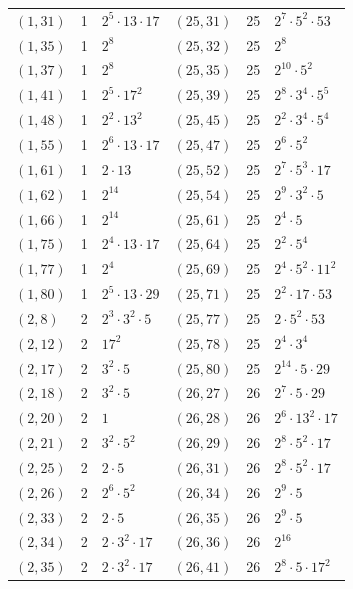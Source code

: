 \documentclass[11pt]{article}
\begin{document}
\begin{longtable}{@{}lrl@{\qquad}lrl@{}}
$(1,31)$ & 1 & $2^{5}\cdot 13\cdot 17$ & $(25,31)$ & 25 & $2^{7}\cdot 5^{2}\cdot 53$\\
$(1,35)$ & 1 & $2^{8}$ & $(25,32)$ & 25 & $2^{8}$\\
$(1,37)$ & 1 & $2^{8}$ & $(25,35)$ & 25 & $2^{10}\cdot 5^{2}$\\
$(1,41)$ & 1 & $2^{5}\cdot 17^{2}$ & $(25,39)$ & 25 & $2^{8}\cdot 3^{4}\cdot 5^{5}$\\
$(1,48)$ & 1 & $2^{2}\cdot 13^{2}$ & $(25,45)$ & 25 & $2^{2}\cdot 3^{4}\cdot 5^{4}$\\
$(1,55)$ & 1 & $2^{6}\cdot 13\cdot 17$ & $(25,47)$ & 25 & $2^{6}\cdot 5^{2}$\\
$(1,61)$ & 1 & $2\cdot 13$ & $(25,52)$ & 25 & $2^{7}\cdot 5^{3}\cdot 17$\\
$(1,62)$ & 1 & $2^{14}$ & $(25,54)$ & 25 & $2^{9}\cdot 3^{2}\cdot 5$\\
$(1,66)$ & 1 & $2^{14}$ & $(25,61)$ & 25 & $2^{4}\cdot 5$\\
$(1,75)$ & 1 & $2^{4}\cdot 13\cdot 17$ & $(25,64)$ & 25 & $2^{2}\cdot 5^{4}$\\
$(1,77)$ & 1 & $2^{4}$ & $(25,69)$ & 25 & $2^{4}\cdot 5^{2}\cdot 11^{2}$\\
$(1,80)$ & 1 & $2^{5}\cdot 13\cdot 29$ & $(25,71)$ & 25 & $2^{2}\cdot 17\cdot 53$\\
$(2,8)$ & 2 & $2^{3}\cdot 3^{2}\cdot 5$ & $(25,77)$ & 25 & $2\cdot 5^{2}\cdot 53$\\
$(2,12)$ & 2 & $17^{2}$ & $(25,78)$ & 25 & $2^{4}\cdot 3^{4}$\\
$(2,17)$ & 2 & $3^{2}\cdot 5$ & $(25,80)$ & 25 & $2^{14}\cdot 5\cdot 29$\\
$(2,18)$ & 2 & $3^{2}\cdot 5$ & $(26,27)$ & 26 & $2^{7}\cdot 5\cdot 29$\\
$(2,20)$ & 2 & $1$ & $(26,28)$ & 26 & $2^{6}\cdot 13^{2}\cdot 17$\\
$(2,21)$ & 2 & $3^{2}\cdot 5^{2}$ & $(26,29)$ & 26 & $2^{8}\cdot 5^{2}\cdot 17$\\
$(2,25)$ & 2 & $2\cdot 5$ & $(26,31)$ & 26 & $2^{8}\cdot 5^{2}\cdot 17$\\
$(2,26)$ & 2 & $2^{6}\cdot 5^{2}$ & $(26,34)$ & 26 & $2^{9}\cdot 5$\\
$(2,33)$ & 2 & $2\cdot 5$ & $(26,35)$ & 26 & $2^{9}\cdot 5$\\
$(2,34)$ & 2 & $2\cdot 3^{2}\cdot 17$ & $(26,36)$ & 26 & $2^{16}$\\
$(2,35)$ & 2 & $2\cdot 3^{2}\cdot 17$ & $(26,41)$ & 26 & $2^{8}\cdot 5\cdot 17^{2}$\\

\end{longtable}
\end{document}
